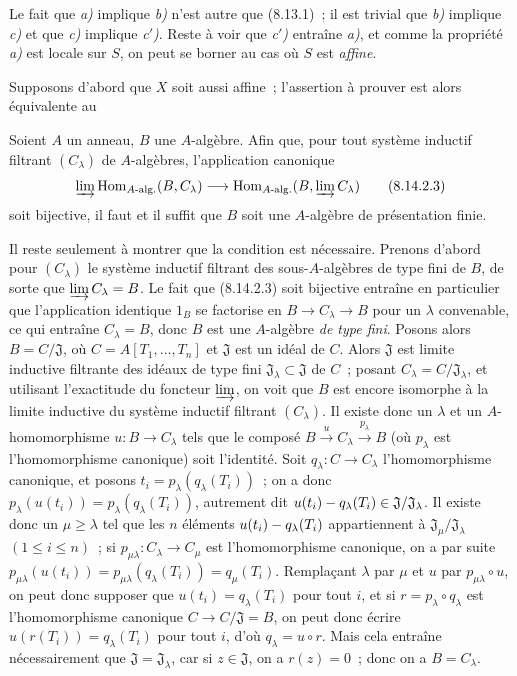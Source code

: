 Le fait que \emph{a)} implique \emph{b)} n'est autre que (8.13.1)~; il est
trivial que \emph{b)} implique \emph{c)} et que \emph{c)} implique
\emph{c$'$)}. Reste à voir que \emph{c$'$)} entraîne \emph{a)}, et comme la
propriété \emph{a)} est locale sur $S$, on peut se borner au cas où $S$ est
\emph{affine}.

Supposons d'abord que $X$ soit aussi affine~; l'assertion à prouver est alors
équivalente au

\begin{corollary}[8.14.2.2]
\label{IV.8.14.2.2-fr}
Soient $A$ un anneau, $B$ une $A$-algèbre. Afin que, pour tout système
inductif filtrant $(C_\lambda)$ de $A$-algèbres, l'application canonique
\begin{equation}
\label{IV.8.14.2.3-fr}
\varinjlim\operatorname{Hom}_{A\text{-}\mathrm{alg.}}(B,C_\lambda)
\longrightarrow
\operatorname{Hom}_{A\text{-}\mathrm{alg.}}
(B,\varinjlim C_\lambda) \tag{8.14.2.3}
\end{equation}
soit bijective, il faut et il suffit que $B$ soit une $A$-algèbre de
présentation finie.
\end{corollary}

Il reste seulement à montrer que la condition est nécessaire. Prenons d'abord
pour $(C_\lambda)$ le système inductif filtrant des sous-$A$-algèbres de type
fini de $B$, de sorte que $\varinjlim C_\lambda=B$. Le fait que (8.14.2.3)
soit bijective entraîne en particulier que l'application identique
$1_B$ se factorise en $B\to C_\lambda\to B$ pour un $\lambda$ convenable,
ce qui entraîne $C_\lambda=B$, donc $B$ est une $A$-algèbre \emph{de type
fini}. Posons alors $B=C/\mathfrak J$, où
$C=A[T_1,\ldots,T_n]$ et $\mathfrak J$ est un idéal de $C$. Alors
$\mathfrak J$ est limite inductive filtrante des idéaux de type fini
$\mathfrak J_\lambda\subset\mathfrak J$ de $C$~; posant
$C_\lambda=C/\mathfrak J_\lambda$, et utilisant l'exactitude du foncteur
$\varinjlim$, on voit que $B$ est encore isomorphe à la limite inductive du
système inductif filtrant $(C_\lambda)$. Il existe donc un $\lambda$ et un
$A$-homomorphisme $u:B\to C_\lambda$ tels que le composé
$B\xrightarrow{u}C_\lambda\xrightarrow{p_\lambda}B$
(où $p_\lambda$ est l'homomorphisme canonique) soit l'identité. Soit
$q_\lambda:C\to C_\lambda$ l'homomorphisme canonique, et posons
$t_i=p_\lambda(q_\lambda(T_i))$~; on a donc
$p_\lambda(u(t_i))=p_\lambda(q_\lambda(T_i))$, autrement dit
$u(t_i)- q_\lambda(T_i)\in\mathfrak J/\mathfrak J_\lambda$.
Il existe donc un $\mu\geqslant\lambda$ tel que les $n$ éléments
$u(t_i)- q_\lambda(T_i)$ appartiennent à
$\mathfrak J_\mu/\mathfrak J_\lambda$ $(1\leqslant i\leqslant n)$~; si
$p_{\mu\lambda}:C_\lambda\to C_\mu$ est l'homomorphisme canonique, on a par
suite
$p_{\mu\lambda}(u(t_i))
=p_{\mu\lambda}(q_\lambda(T_i))=q_\mu(T_i)$.
Remplaçant $\lambda$ par $\mu$ et $u$ par $p_{\mu\lambda}\circ u$, on peut
donc supposer que $u(t_i)=q_\lambda(T_i)$ pour tout $i$, et si
$r=p_\lambda\circ q_\lambda$ est l'homomorphisme canonique
$C\to C/\mathfrak J=B$, on peut donc écrire
$u(r(T_i))=q_\lambda(T_i)$ pour tout $i$, d'où
$q_\lambda=u\circ r$. Mais cela entraîne nécessairement que
$\mathfrak J=\mathfrak J_\lambda$, car si $z\in\mathfrak J$, on a
$r(z)=0$~; donc on a $B=C_\lambda$.

